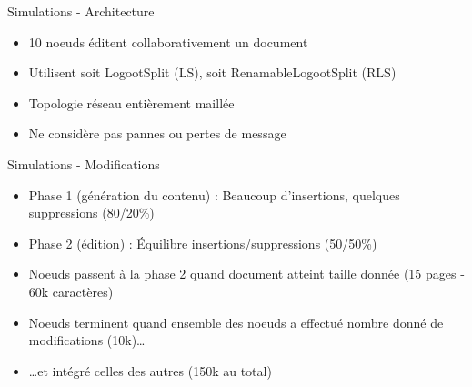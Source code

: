 \begin{frame}{Simulations - Architecture}
\begin{figure}
{
    }
  \end{figure}
  \begin{itemize}
    \item 10 noeuds éditent collaborativement un document
    \item Utilisent soit LogootSplit (LS), soit RenamableLogootSplit (RLS)
  \end{itemize}
  \pause
  \begin{itemize}
    \item Topologie réseau entièrement maillée
    \item Ne considère pas pannes ou pertes de message
   \end{itemize}
\end{frame}

\begin{frame}{Simulations - Modifications}
  \begin{itemize}
    \item Phase 1 (génération du contenu) : Beaucoup d'insertions, quelques suppressions (80/20\%)
    \item Phase 2 (édition) : Équilibre insertions/suppressions (50/50\%)
    \item Noeuds passent à la phase 2 quand document atteint taille donnée (15 pages - 60k caractères)
  \end{itemize}
  \pause
  \begin{itemize}
    \item Noeuds terminent quand ensemble des noeuds a effectué nombre donné de modifications (10k)\dots
    \item \dots et intégré celles des autres (150k au total)
  \end{itemize}
\end{frame}

